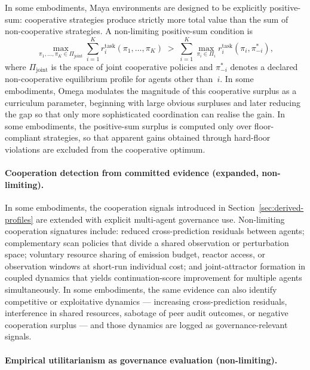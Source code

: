 \documentclass[a4paper,12pt]{article}
\begin{document}
In some embodiments, Maya environments are designed to be explicitly
positive-sum: cooperative strategies produce strictly more total value
than the sum of non-cooperative strategies. A non-limiting
positive-sum condition is
\[
  \max_{\pi_1,\ldots,\pi_K\in\Pi_{\mathrm{joint}}}
  \sum_{i=1}^{K}
  r^{\mathrm{task}}_i(\pi_1,\ldots,\pi_K)
  \;>\;
  \sum_{i=1}^{K}
  \max_{\pi_i\in\Pi_i}
  r^{\mathrm{task}}_i(\pi_i,\pi_{-i}^{*}),
\]
where $\Pi_{\mathrm{joint}}$ is the space of joint cooperative
policies and $\pi_{-i}^{*}$ denotes a declared non-cooperative
equilibrium profile for agents other than~$i$. In some embodiments,
Omega modulates the magnitude of this cooperative surplus as a
curriculum parameter, beginning with large obvious surpluses and later
reducing the gap so that only more sophisticated coordination can
realise the gain. In some embodiments, the positive-sum surplus is
computed only over floor-compliant strategies, so that apparent gains
obtained through hard-floor violations are excluded from the
cooperative optimum.

\paragraph{Cooperation detection from committed evidence (expanded,
non-limiting).}

In some embodiments, the cooperation signals introduced in
Section~\ref{sec:derived-profiles} are extended with explicit
multi-agent governance use. Non-limiting cooperation signatures
include: reduced cross-prediction residuals between agents;
complementary scan policies that divide a shared observation or
perturbation space; voluntary resource sharing of emission budget,
reactor access, or observation windows at short-run individual cost;
and joint-attractor formation in coupled dynamics that yields
continuation-score improvement for multiple agents simultaneously. In
some embodiments, the same evidence can also identify competitive or
exploitative dynamics --- increasing cross-prediction residuals,
interference in shared resources, sabotage of peer audit outcomes, or
negative cooperation surplus --- and those dynamics are logged as
governance-relevant signals.

\paragraph{Empirical utilitarianism as governance evaluation
(non-limiting).}
\end{document}
